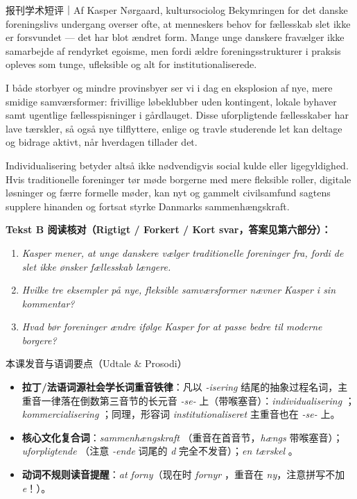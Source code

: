 \begin{emailbox}{报刊学术短评｜Af Kasper Nørgaard, kultursociolog}
Bekymringen for det danske foreningslivs undergang overser ofte, at menneskers behov for fællesskab slet ikke er forsvundet --- det har blot ændret form. Mange unge danskere fravælger ikke samarbejde af rendyrket egoisme, men fordi ældre foreningsstrukturer i praksis opleves som tunge, ufleksible og alt for institutionaliserede.

I både storbyer og mindre provinsbyer ser vi i dag en eksplosion af nye, mere smidige samværsformer: frivillige løbeklubber uden kontingent, lokale byhaver samt ugentlige fællesspisninger i gårdlauget. Disse uforpligtende fællesskaber har lave tærskler, så også nye tilflyttere, enlige og travle studerende let kan deltage og bidrage aktivt, når hverdagen tillader det.

Individualisering betyder altså ikke nødvendigvis social kulde eller ligegyldighed. Hvis traditionelle foreninger tør møde borgerne med mere fleksible roller, digitale løsninger og færre formelle møder, kan nyt og gammelt civilsamfund sagtens supplere hinanden og fortsat styrke Danmarks sammenhængskraft.
\end{emailbox}

\textbf{Tekst B 阅读核对（Rigtigt / Forkert / Kort svar，答案见第六部分）：}
\begin{enumerate}
  \item \textit{Kasper mener, at unge danskere vælger traditionelle foreninger fra, fordi de slet ikke ønsker fællesskab længere.} \underline{\hspace{2.2cm}}
  \item \textit{Hvilke tre eksempler på nye, fleksible samværsformer nævner Kasper i sin kommentar?} \underline{\hspace{2.2cm}}
  \item \textit{Hvad bør foreninger ændre ifølge Kasper for at passe bedre til moderne borgere?} \underline{\hspace{2.2cm}}
\end{enumerate}

\begin{tipbox}{本课发音与语调要点（Udtale \& Prosodi）}
\begin{itemize}
  \item \textbf{拉丁/法语词源社会学长词重音铁律}：凡以 \textit{-isering} 结尾的抽象过程名词，主重音一律落在倒数第三音节的长元音 \textit{-se-} 上（带喉塞音）：\textit{individualisering} ；\textit{kommercialisering} ；同理，形容词 \textit{institutionaliseret}  主重音也在 \textit{-se-} 上。
  \item \textbf{核心文化复合词}：\textit{sammenhængskraft} （重音在首音节，\textit{hængs} 带喉塞音）；\textit{uforpligtende} （注意 \textit{-ende} 词尾的 \textit{d} 完全不发音）；\textit{en tærskel} 。
  \item \textbf{动词不规则读音提醒}：\textit{at forny}（现在时 \textit{fornyr} ，重音在 \textit{ny}，注意拼写不加 \textit{e}！）。
\end{itemize}
\end{tipbox}

